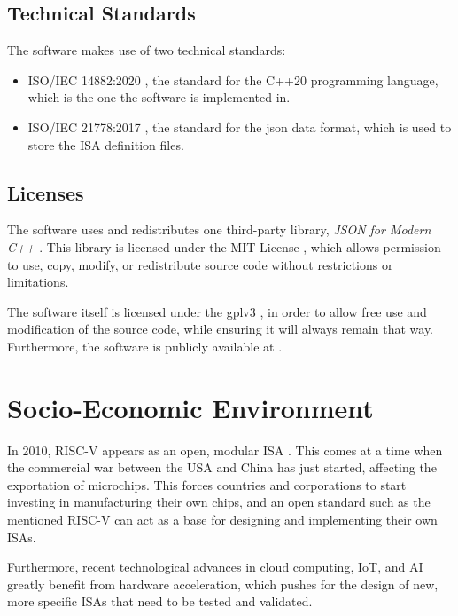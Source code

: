 \subsection{Technical Standards}\label{subsec:standards}
The software makes use of two technical standards:
\begin{itemize}
  \item ISO/IEC 14882:2020 \parencite{ISOcpp20}, the standard for the C++20 programming language, which is the one the software is implemented in.
  \item ISO/IEC 21778:2017 \parencite{ISO21778}, the standard for the \gls{json} data format, which is used to store the \gls{ISA} definition files.
\end{itemize}


\subsection{Licenses}\label{subsec:licenses}
The software uses and redistributes one third-party library, \textit{JSON for Modern C++} \parencite{nlohmann/json}. This library is licensed under the MIT License \parencite{MITLicense}, which allows permission to use, copy, modify, or redistribute source code without restrictions or limitations.

The software itself is licensed under the \gls{gplv3} \parencite{gplv3}, in order to allow free use and modification of the source code, while ensuring it will always remain that way. Furthermore, the software is publicly available at \myrepo.



\section{Socio-Economic Environment}\label{sec:environment}
In 2010, RISC-V appears as an open, modular \gls{ISA} \parencite{riscvOrigin}. This comes at a time when the commercial war between the USA and China has just started, affecting the exportation of microchips. This forces countries and corporations to start investing in manufacturing their own chips, and an open standard such as the mentioned RISC-V can act as a base for designing and implementing their own \glspl{ISA}.

Furthermore, recent technological advances in \gls{cloud computing}, \gls{IoT}, and \gls{AI} greatly benefit from hardware acceleration, which pushes for the design of new, more specific \glspl{ISA} that need to be tested and validated.

